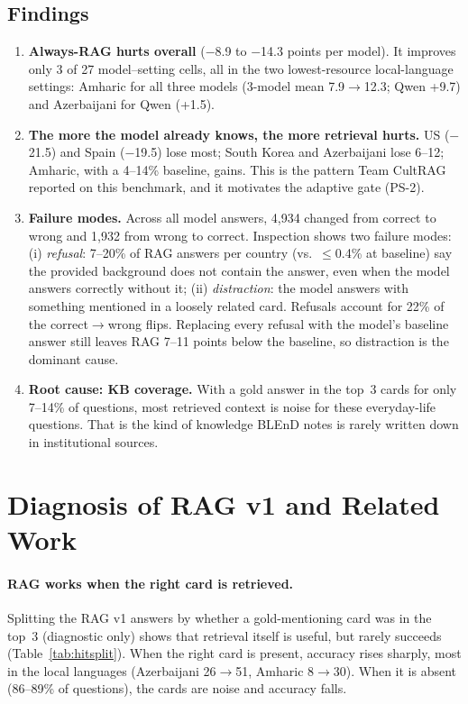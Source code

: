 \documentclass[11pt]{article}
\begin{document}
\subsection{Findings}
\begin{enumerate}
\item \textbf{Always-RAG hurts overall} ($-$8.9 to $-$14.3 points per model). It improves only 3 of
27 model--setting cells, all in the two lowest-resource local-language settings: Amharic for all three
models (3-model mean 7.9$\rightarrow$12.3; Qwen +9.7) and Azerbaijani for Qwen (+1.5).
\item \textbf{The more the model already knows, the more retrieval hurts.} US ($-$21.5) and Spain
($-$19.5) lose most; South Korea and Azerbaijani lose 6--12; Amharic, with a 4--14\% baseline, gains.
This is the pattern Team CultRAG reported on this benchmark, and it motivates the adaptive gate (PS-2).
\item \textbf{Failure modes.} Across all model answers, 4{,}934 changed from correct to wrong and 1{,}932
from wrong to correct. Inspection shows two failure modes:
(i) \emph{refusal}: 7--20\% of RAG answers per country (vs.\ $\leq$0.4\% at baseline) say the provided background does
not contain the answer, even when the model answers correctly without it;
(ii) \emph{distraction}: the model answers with something mentioned in a loosely related card.
Refusals account for 22\% of the correct$\rightarrow$wrong flips. Replacing every refusal with the
model's baseline answer still leaves RAG 7--11 points below the baseline, so distraction is the
dominant cause.
\item \textbf{Root cause: KB coverage.} With a gold answer in the top~3 cards for only 7--14\% of
questions, most retrieved context is noise for these everyday-life questions. That is the kind of
knowledge BLEnD notes is rarely written down in institutional sources.
\end{enumerate}

\section{Diagnosis of RAG v1 and Related Work}
\label{sec:diag}
\paragraph{RAG works when the right card is retrieved.} Splitting the RAG v1 answers by whether a
gold-mentioning card was in the top~3 (diagnostic only) shows that retrieval itself is useful, but
rarely succeeds (Table~\ref{tab:hitsplit}). When the right card is present, accuracy rises sharply,
most in the local languages (Azerbaijani 26$\rightarrow$51, Amharic 8$\rightarrow$30). When it is
absent (86--89\% of questions), the cards are noise and accuracy falls.
\end{document}
